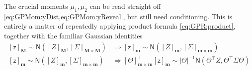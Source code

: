 \documentclass[preprint,12pt]{elsarticle}
\newcommand*{\M}[1]{\ensuremath{#1}\xspace}
\newcommand*{\x}{\times}
\newcommand*{\mi}[1]{\mathbf{#1}}
\newcommand*{\rv}[1]{\mathsf{#1}}
\newcommand*{\te}[2][]{\left\lbrack{#2}\right\rbrack_{#1}}
\newcommand*{\gauss}[2]{\mathsf{N}\!\left({#1,#2}\right)}
\newcommand*{\modulus}[1]{\M{\left\lvert{#1}\right\rvert}}
\begin{document}
    The crucial moments $\mu_{1},\mu_{2}$ can be read straight off \cref{eq:GPMom:yDist,eq:GPMom:yReveal}, but still need conditioning. This is entirely a matter of repeatedly applying product formula \cref{eq:GPR:product}, together with the familiar Gaussian identities
    \begin{equation*}
        \begin{aligned}
            \te[\mi{M}]{\rv{z}} \sim \gauss{\te[\mi{M}]{Z}}{\te[\mi{M}\x\mi{M}]{\Sigma}} &\Rightarrow
            \te[\mi{m}]{\rv{z}} \sim \gauss{\te[\mi{m}]{Z}}{\te[\mi{m}\x\mi{m}]{\Sigma}} \\
            \te[\mi{m}]{\rv{z}} \sim \gauss{\te[\mi{m}]{Z}}{\te[\mi{m}\x\mi{m}]{\Sigma}} &\Rightarrow
            \te[\mi{m}\x\mi{m}]{\Theta}^{\intercal}\te[\mi{m}]{\rv{z}} \sim 
            \modulus{\Theta}^{-1}
            \gauss{\Theta^{\intercal}Z}{\Theta^{\intercal}\Sigma\Theta}                        
        \end{aligned}
    \end{equation*}
\end{document}
